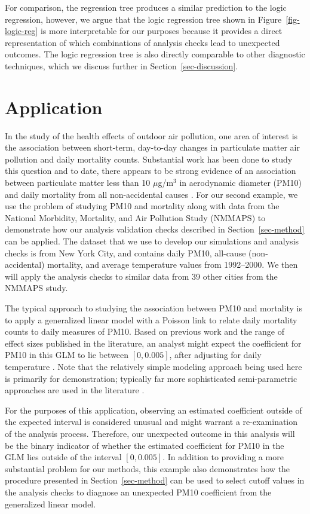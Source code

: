\documentclass[
  12pt,
]{interact}
\begin{document}
For comparison, the regression tree produces a similar prediction to the
logic regression, however, we argue that the logic regression tree shown
in Figure~\ref{fig-logic-reg} is more interpretable for our purposes
because it provides a direct representation of which combinations of
analysis checks lead to unexpected outcomes. The logic regression tree
is also directly comparable to other diagnostic techniques, which we
discuss further in Section~\ref{sec-discussion}.

\section{Application}\label{sec-pm10-mortality}

In the study of the health effects of outdoor air pollution, one area of
interest is the association between short-term, day-to-day changes in
particulate matter air pollution and daily mortality counts. Substantial
work has been done to study this question and to date, there appears to
be strong evidence of an association between particulate matter less
than 10 \(\mu\)g/m\(^3\) in aerodynamic diameter (PM10) and daily
mortality from all non-accidental causes \citep{samet2000fine}. For our
second example, we use the problem of studying PM10 and mortality along
with data from the National Morbidity, Mortality, and Air Pollution
Study (NMMAPS) to demonstrate how our analysis validation checks
described in Section~\ref{sec-method} can be applied. The dataset that
we use to develop our simulations and analysis checks is from New York
City, and contains daily PM10, all-cause (non-accidental) mortality, and
average temperature values from 1992--2000. We then will apply the
analysis checks to similar data from 39 other cities from the NMMAPS
study.

The typical approach to studying the association between PM10 and
mortality is to apply a generalized linear model with a Poisson link to
relate daily mortality counts to daily measures of PM10. Based on
previous work and the range of effect sizes published in the literature,
an analyst might expect the coefficient for PM10 in this GLM to lie
between \([0, 0.005]\), after adjusting for daily temperature
\citep{samet2000fine, welty2005acute}. Note that the relatively simple
modeling approach being used here is primarily for demonstration;
typically far more sophisticated semi-parametric approaches are used in
the literature \citep{peng2006model}.

For the purposes of this application, observing an estimated coefficient
outside of the expected interval is considered unusual and might warrant
a re-examination of the analysis process. Therefore, our unexpected
outcome in this analysis will be the binary indicator of whether the
estimated coefficient for PM10 in the GLM lies outside of the interval
\([0, 0.005]\). In addition to providing a more substantial problem for
our methods, this example also demonstrates how the procedure presented
in Section~\ref{sec-method} can be used to select cutoff values in the
analysis checks to diagnose an unexpected PM10 coefficient from the
generalized linear model.
\end{document}
